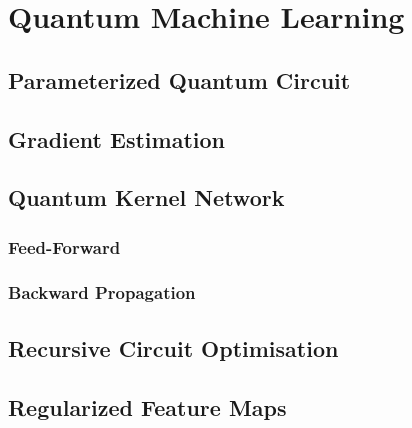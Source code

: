 \chapter{Quantum Machine Learning}\label{chap:QML}


\section{Parameterized Quantum Circuit}\label{sec:PQC}


\section{Gradient Estimation}\label{sec:Gradient Estimation}


\section{Quantum Kernel Network}\label{sec:Quantum Kernel Network}


\subsection{Feed-Forward}\label{sec:FeedForward}


\subsection{Backward Propagation}\label{sec:BackwardPropagation}


\section{Recursive Circuit Optimisation}\label{sec:RCO}

\section{Regularized Feature Maps}\label{sec:RFM}


